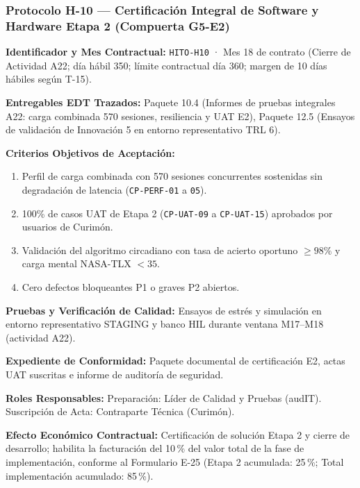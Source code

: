 \subsubsection*{Protocolo H-10 — Certificación Integral de Software y Hardware Etapa 2 (Compuerta G5-E2)}\label{sec:9-proto-h10}
\par\noindent\textbf{Identificador y Mes Contractual:} \texttt{HITO-H10} · Mes 18 de contrato (Cierre de Actividad A22; día hábil 350; límite contractual día 360; margen de 10 días hábiles según T-15).\par
\par\noindent\textbf{Entregables EDT Trazados:} Paquete 10.4 (Informes de pruebas integrales A22: carga combinada 570 sesiones, resiliencia y UAT E2), Paquete 12.5 (Ensayos de validación de Innovación 5 en entorno representativo TRL 6).\par
\par\noindent\textbf{Criterios Objetivos de Aceptación:}
\begin{enumerate}
  \item Perfil de carga combinada con 570 sesiones concurrentes sostenidas sin degradación de latencia (\texttt{CP-PERF-01} a \texttt{05}).
  \item 100\% de casos UAT de Etapa 2 (\texttt{CP-UAT-09} a \texttt{CP-UAT-15}) aprobados por usuarios de Curimón.
  \item Validación del algoritmo circadiano con tasa de acierto oportuno $\ge 98\%$ y carga mental NASA-TLX $< 35$.
  \item Cero defectos bloqueantes P1 o graves P2 abiertos.
\end{enumerate}
\par\noindent\textbf{Pruebas y Verificación de Calidad:} Ensayos de estrés y simulación en entorno representativo STAGING y banco HIL durante ventana M17--M18 (actividad A22).\par
\par\noindent\textbf{Expediente de Conformidad:} Paquete documental de certificación E2, actas UAT suscritas e informe de auditoría de seguridad.\par
\par\noindent\textbf{Roles Responsables:} Preparación: Líder de Calidad y Pruebas (audIT). Suscripción de Acta: Contraparte Técnica (Curimón).\par
\par\noindent\textbf{Efecto Económico Contractual:} Certificación de solución Etapa 2 y cierre de desarrollo; habilita la facturación del 10\,\% del valor total de la fase de implementación, conforme al Formulario E-25 (Etapa 2 acumulada: 25\,\%; Total implementación acumulado: 85\,\%).\par

